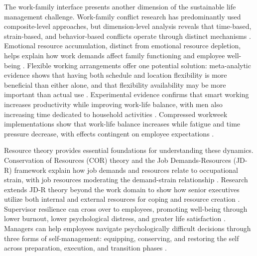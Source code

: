 The work-family interface presents another dimension of the sustainable life management challenge. Work-family conflict research has predominantly used composite-level approaches, but dimension-level analysis reveals that time-based, strain-based, and behavior-based conflicts operate through distinct mechanisms \citep{hetrick_theoretical_2023}. Emotional resource accumulation, distinct from emotional resource depletion, helps explain how work demands affect family functioning and employee well-being \citep{ilies_emotional_2020}. Flexible working arrangements offer one potential solution: meta-analytic evidence shows that having both schedule and location flexibility is more beneficial than either alone, and that flexibility availability may be more important than actual use \citep{harrop_meta_2025}. Experimental evidence confirms that smart working increases productivity while improving work-life balance, with men also increasing time dedicated to household activities \citep{angelici_smart_2024}. Compressed workweek implementations show that work-life balance increases while fatigue and time pressure decrease, with effects contingent on employee expectations \citep{mühl_you_2024}.

Resource theory provides essential foundations for understanding these dynamics. Conservation of Resources (COR) theory and the Job Demands-Resources (JD-R) framework explain how job demands and resources relate to occupational strain, with job resources moderating the demand-strain relationship \citep{ghanayem_occupational_2020}. Research extends JD-R theory beyond the work domain to show how senior executives utilize both internal and external resources for coping and resource creation \citep{duan_extending_2024}. Supervisor resilience can cross over to employees, promoting well-being through lower burnout, lower psychological distress, and greater life satisfaction \citep{brady_supervisor_2025}. Managers can help employees navigate psychologically difficult decisions through three forms of self-management: equipping, conserving, and restoring the self across preparation, execution, and transition phases \citep{molinsky_how_2023}.

